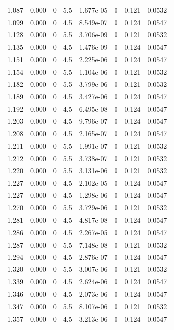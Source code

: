 \documentclass[preview]{standalone}
\begin{document}
{{{\begin{tabular}{L{1.2cm}C{1.2cm} C{0.3cm}C{0.5cm} C{1.4cm}C{1.4cm} C{1.4cm}C{1.4cm}}
  1.087  &  0.000  & 0     & 5.5 &  1.677e-05  & 0  & 0.121 &  0.0532   \\ 
  1.099  &  0.000  & 0     & 4.5 &  8.549e-07  & 0  & 0.124 &  0.0547   \\ 
  1.128  &  0.000  & 0     & 5.5 &  3.706e-09  & 0  & 0.121 &  0.0532   \\ 
  1.135  &  0.000  & 0     & 4.5 &  1.476e-09  & 0  & 0.124 &  0.0547   \\ 
  1.151  &  0.000  & 0     & 4.5 &  2.225e-06  & 0  & 0.124 &  0.0547   \\ 
  1.154  &  0.000  & 0     & 5.5 &  1.104e-06  & 0  & 0.121 &  0.0532   \\ 
  1.182  &  0.000  & 0     & 5.5 &  3.799e-06  & 0  & 0.121 &  0.0532   \\ 
  1.189  &  0.000  & 0     & 4.5 &  3.427e-06  & 0  & 0.124 &  0.0547   \\ 
  1.192  &  0.000  & 0     & 4.5 &  6.495e-08  & 0  & 0.124 &  0.0547   \\ 
  1.203  &  0.000  & 0     & 4.5 &  9.796e-07  & 0  & 0.124 &  0.0547   \\ 
  1.208  &  0.000  & 0     & 4.5 &  2.165e-07  & 0  & 0.124 &  0.0547   \\ 
  1.211  &  0.000  & 0     & 5.5 &  1.991e-07  & 0  & 0.121 &  0.0532   \\ 
  1.212  &  0.000  & 0     & 5.5 &  3.738e-07  & 0  & 0.121 &  0.0532   \\ 
  1.220  &  0.000  & 0     & 5.5 &  3.131e-06  & 0  & 0.121 &  0.0532   \\ 
  1.227  &  0.000  & 0     & 4.5 &  2.102e-05  & 0  & 0.124 &  0.0547   \\ 
  1.227  &  0.000  & 0     & 4.5 &  1.298e-06  & 0  & 0.124 &  0.0547   \\ 
  1.270  &  0.000  & 0     & 5.5 &  3.729e-06  & 0  & 0.121 &  0.0532   \\ 
  1.281  &  0.000  & 0     & 4.5 &  4.817e-08  & 0  & 0.124 &  0.0547   \\ 
  1.286  &  0.000  & 0     & 4.5 &  2.267e-05  & 0  & 0.124 &  0.0547   \\ 
  1.287  &  0.000  & 0     & 5.5 &  7.148e-08  & 0  & 0.121 &  0.0532   \\ 
  1.294  &  0.000  & 0     & 4.5 &  2.876e-07  & 0  & 0.124 &  0.0547   \\ 
  1.320  &  0.000  & 0     & 5.5 &  3.007e-06  & 0  & 0.121 &  0.0532   \\ 
  1.339  &  0.000  & 0     & 4.5 &  2.624e-06  & 0  & 0.124 &  0.0547   \\ 
  1.346  &  0.000  & 0     & 4.5 &  2.073e-06  & 0  & 0.124 &  0.0547   \\ 
  1.347  &  0.000  & 0     & 5.5 &  8.107e-06  & 0  & 0.121 &  0.0532   \\ 
  1.357  &  0.000  & 0     & 4.5 &  3.213e-06  & 0  & 0.124 &  0.0547   \\ 
\hline 
\end{tabular} 

}}}
\end{document}
